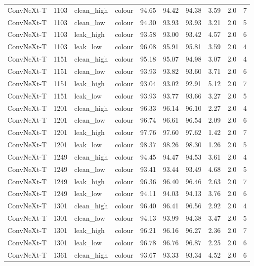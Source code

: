 {\begin{longtable}{lrllrrrrrr}
ConvNeXt-T & 1103 & clean\_high & colour & 94.65 & 94.42 & 94.38 & 3.59 & 2.0 & 7 \\
ConvNeXt-T & 1103 & clean\_low & colour & 94.30 & 93.93 & 93.93 & 3.21 & 2.0 & 5 \\
ConvNeXt-T & 1103 & leak\_high & colour & 93.58 & 93.00 & 93.42 & 4.57 & 2.0 & 6 \\
ConvNeXt-T & 1103 & leak\_low & colour & 96.08 & 95.91 & 95.81 & 3.59 & 2.0 & 4 \\
ConvNeXt-T & 1151 & clean\_high & colour & 95.18 & 95.07 & 94.98 & 3.07 & 2.0 & 4 \\
ConvNeXt-T & 1151 & clean\_low & colour & 93.93 & 93.82 & 93.60 & 3.71 & 2.0 & 6 \\
ConvNeXt-T & 1151 & leak\_high & colour & 93.04 & 93.02 & 92.91 & 5.12 & 2.0 & 7 \\
ConvNeXt-T & 1151 & leak\_low & colour & 93.93 & 93.77 & 93.66 & 3.27 & 2.0 & 5 \\
ConvNeXt-T & 1201 & clean\_high & colour & 96.33 & 96.14 & 96.10 & 2.27 & 2.0 & 4 \\
ConvNeXt-T & 1201 & clean\_low & colour & 96.74 & 96.61 & 96.54 & 2.09 & 2.0 & 6 \\
ConvNeXt-T & 1201 & leak\_high & colour & 97.76 & 97.60 & 97.62 & 1.42 & 2.0 & 7 \\
ConvNeXt-T & 1201 & leak\_low & colour & 98.37 & 98.26 & 98.30 & 1.26 & 2.0 & 5 \\
ConvNeXt-T & 1249 & clean\_high & colour & 94.45 & 94.47 & 94.53 & 3.61 & 2.0 & 4 \\
ConvNeXt-T & 1249 & clean\_low & colour & 93.41 & 93.44 & 93.49 & 4.68 & 2.0 & 5 \\
ConvNeXt-T & 1249 & leak\_high & colour & 96.36 & 96.40 & 96.46 & 2.63 & 2.0 & 7 \\
ConvNeXt-T & 1249 & leak\_low & colour & 94.11 & 94.03 & 94.13 & 3.76 & 2.0 & 6 \\
ConvNeXt-T & 1301 & clean\_high & colour & 96.40 & 96.41 & 96.56 & 2.92 & 2.0 & 4 \\
ConvNeXt-T & 1301 & clean\_low & colour & 94.13 & 93.99 & 94.38 & 3.47 & 2.0 & 5 \\
ConvNeXt-T & 1301 & leak\_high & colour & 96.21 & 96.16 & 96.27 & 2.36 & 2.0 & 7 \\
ConvNeXt-T & 1301 & leak\_low & colour & 96.78 & 96.76 & 96.87 & 2.25 & 2.0 & 6 \\
ConvNeXt-T & 1361 & clean\_high & colour & 93.67 & 93.33 & 93.34 & 4.52 & 2.0 & 6 \\

\end{longtable}}

